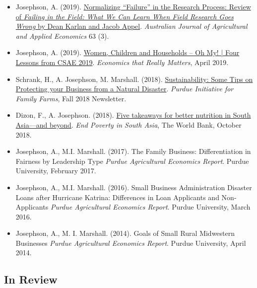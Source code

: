 \documentclass[letterpaper]{article}
\begin{document}
\begin{itemize}
\item Josephson, A. (2019). \href{https://onlinelibrary.wiley.com/doi/10.1111/1467-8489.12324}{Normalizing “Failure” in the Research Process: Review of \emph{Failing in the Field: What We Can Learn When Field Research Goes Wrong} by Dean Karlan and Jacob Appel}. \emph{Australian Journal of Agricultural and Applied Economics} 63 (3). 
	
\item Josephson, A. (2019). \href{http://www.econthatmatters.com/2019/04/women-children-and-households-oh-my-four-lessons-from-csae-2019/}{Women, Children and Households – Oh My! | Four Lessons from CSAE 2019}. \textit{Economics that Really Matters}, April 2019. 
			
\item Schrank, H., A. Josephson, M. Marshall. (2018). \href{https://ag.purdue.edu/agecon/PIFF/Documents/2018_Fall_PIFF_Newsletter.pdf}{Sustainability: Some Tips on Protecting your Business from a Natural Disaster}. \textit{Purdue Initiative for Family Farms}, Fall 2018 Newsletter. 

\item Dizon, F., A. Josephson. (2018). \href{http://blogs.worldbank.org/endpovertyinsouthasia/five-takeaways-better-nutrition-south-asia-and-beyond}{Five takeaways for better nutrition in South Asia—and beyond}. \textit{End Poverty in South Asia}, The World Bank, October 2018. 
		
\item Josephson, A., M.I. Marshall. (2017). The Family Business: Differentiation in Fairness by Leadership Type \textit{Purdue Agricultural Economics Report}. Purdue University, February 2017.

\item Josephson, A., M.I. Marshall. (2016). Small Business Administration Disaster Loans after Hurricane Katrina: Differences in Loan Applicants and Non-Applicants \textit{Purdue Agricultural Economics Report}. Purdue University, March 2016.

\item Josephson, A., M. I. Marshall. (2014). Goals of Small Rural Midwestern Businesses \textit{Purdue Agricultural Economics Report}. Purdue University, April 2014. 

\end{itemize}

\subsection*{In Review}
\end{document}
